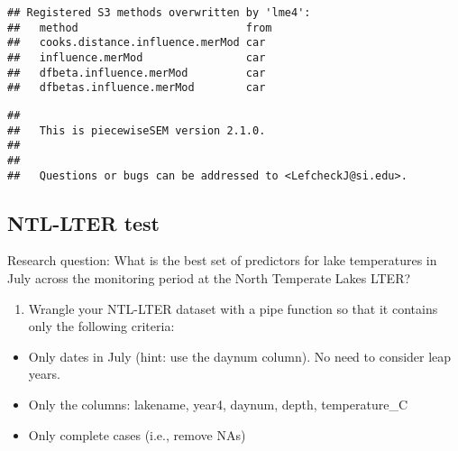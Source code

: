 \documentclass[]{article}
\newenvironment{Shaded}{\begin{snugshade}}{\end{snugshade}}
\newcommand{\CommentTok}[1]{\textcolor[rgb]{0.56,0.35,0.01}{\textit{#1}}}
\newcommand{\DataTypeTok}[1]{\textcolor[rgb]{0.13,0.29,0.53}{#1}}
\newcommand{\DecValTok}[1]{\textcolor[rgb]{0.00,0.00,0.81}{#1}}
\newcommand{\KeywordTok}[1]{\textcolor[rgb]{0.13,0.29,0.53}{\textbf{#1}}}
\newcommand{\NormalTok}[1]{#1}
\newcommand{\OperatorTok}[1]{\textcolor[rgb]{0.81,0.36,0.00}{\textbf{#1}}}
\newcommand{\StringTok}[1]{\textcolor[rgb]{0.31,0.60,0.02}{#1}}
\providecommand{\tightlist}{%
  \setlength{\itemsep}{0pt}\setlength{\parskip}{0pt}}
\begin{document}
\begin{verbatim}
## Registered S3 methods overwritten by 'lme4':
##   method                          from
##   cooks.distance.influence.merMod car 
##   influence.merMod                car 
##   dfbeta.influence.merMod         car 
##   dfbetas.influence.merMod        car
\end{verbatim}

\begin{verbatim}
## 
##   This is piecewiseSEM version 2.1.0.
## 
## 
##   Questions or bugs can be addressed to <LefcheckJ@si.edu>.
\end{verbatim}

\begin{Shaded}
\end{Shaded}

\hypertarget{ntl-lter-test}{%
\subsection{NTL-LTER test}\label{ntl-lter-test}}

Research question: What is the best set of predictors for lake
temperatures in July across the monitoring period at the North Temperate
Lakes LTER?

\begin{enumerate}
\def\labelenumi{\arabic{enumi}.}
\setcounter{enumi}{2}
\tightlist
\item
  Wrangle your NTL-LTER dataset with a pipe function so that it contains
  only the following criteria:
\end{enumerate}

\begin{itemize}
\tightlist
\item
  Only dates in July (hint: use the daynum column). No need to consider
  leap years.
\item
  Only the columns: lakename, year4, daynum, depth, temperature\_C
\item
  Only complete cases (i.e., remove NAs)
\end{itemize}
\end{document}
